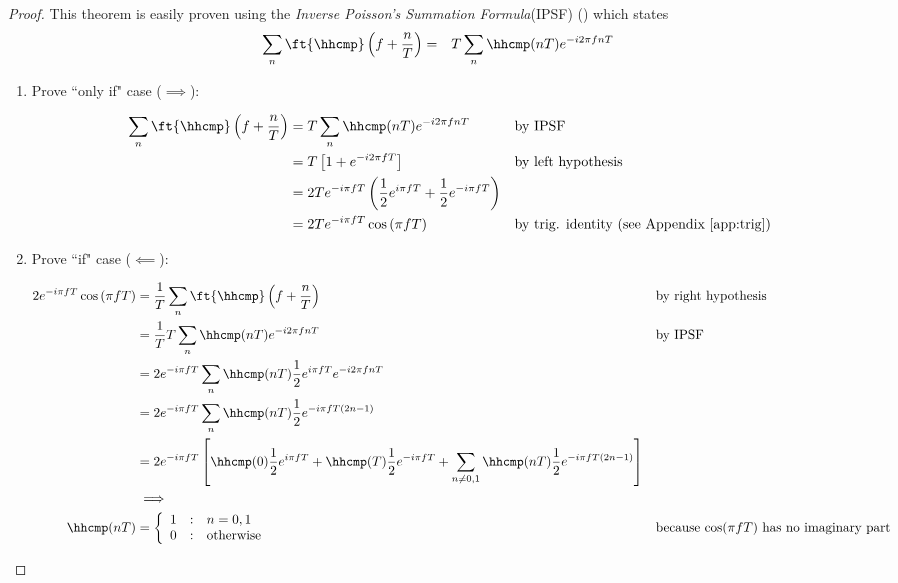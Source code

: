 \begin{proof}
This theorem is easily proven using the
{\em Inverse Poisson's Summation Formula}(IPSF)
()
which states
\begin{eqnarray*}
   \sum_n \ft{\hhcmp}\left( f+ \frac{n}{T} \right)
      &=& T \sum_n \hhcmp(nT) e^{-i2\pi fnT}
\end{eqnarray*}

\begin{enumerate}
\item Prove ``only if" case ($\implies$):

\begin{align*}
  \sum_n \ft{\hhcmp}\left( f + \frac{n}{T} \right)
    &= T\sum_n \hhcmp(nT) e^{-i2\pi fnT}
    && \text{by IPSF}
  \\&= T\left[1 + e^{-i2\pi fT}\right]
    && \text{by left hypothesis}
  \\&= 2Te^{-i\pi fT}\left( \frac{1}{2}e^{i\pi fT} + \frac{1}{2}e^{-i\pi fT}  \right)
  \\&= 2Te^{-i\pi fT}\cos\left(\pi fT\right)
    && \text{by trig. identity (see Appendix \ref{app:trig})}
\end{align*}


\item Prove ``if" case ($\impliedby$):

\begin{align*}
     2e^{-i\pi fT}\cos\left(\pi fT\right)
       &=  \frac{1}{T}\sum_n \ft{\hhcmp}\left( f+\frac{n}{T} \right)
       && \text{by right hypothesis}
     \\&= \frac{1}{T}T \sum_n \hhcmp(nT) e^{-i2\pi fnT}
       && \text{by IPSF}
     \\&= 2e^{-i\pi fT} \sum_n \hhcmp(nT) \frac{1}{2}e^{i\pi fT}e^{-i2\pi fnT}
     \\&= 2e^{-i\pi fT} \sum_n \hhcmp(nT) \frac{1}{2}e^{-i\pi fT(2n-1)}
     \\&= 2e^{-i\pi fT}
             \left[
               \hhcmp(0) \frac{1}{2}e^{i\pi fT} +
               \hhcmp(T) \frac{1}{2}e^{-i\pi fT} +
               \sum_{n\ne 0,1} \hhcmp(nT) \frac{1}{2}e^{-i\pi fT(2n-1)}
             \right]
     \\&\implies
\\
   \hhcmp(nT)
     &= \left\{\begin{array}{lcl}
           1 & : & n=0,1    \\
           0 & : & \text{otherwise}
        \end{array}\right.
       && \text{because $\cos(\pi fT)$ has no imaginary part}
\end{align*}
\end{enumerate}
\end{proof}

